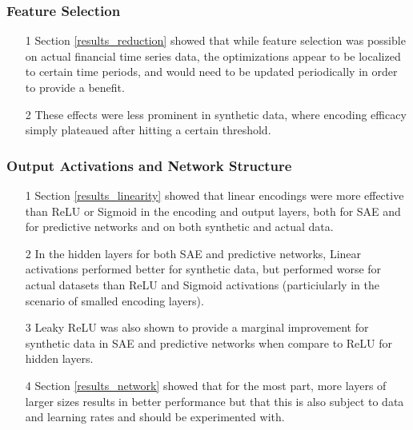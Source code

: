\documentclass[a4paper,11pt,oneside]{article}
\theoremstyle{plain}
\theoremstyle{definition}
\begin{document}
\subsubsection{Feature Selection}
\begin{itemize}
	\item[1] Section \ref{results_reduction} showed that while feature selection was possible on actual financial time series data, the optimizations appear to be localized to certain time periods, and would need to be updated periodically in order to provide a benefit.
	\item[2] These effects were less prominent in synthetic data, where encoding efficacy simply plateaued after hitting a certain threshold.
\end{itemize}

\subsubsection{Output Activations and Network Structure}
\begin{itemize}
	\item[1] Section \ref{results_linearity} showed that linear encodings were more effective than ReLU or Sigmoid in the encoding and output layers, both for SAE and for predictive networks and on both synthetic and actual data.
	\item[2] In the hidden layers for both SAE and predictive networks, Linear activations performed better for synthetic data, but performed worse for actual datasets than ReLU and Sigmoid activations (particiularly in the scenario of smalled encoding layers).
	\item[3] Leaky ReLU was also shown to provide a marginal improvement for synthetic data in SAE and predictive networks when compare to ReLU for hidden layers.
	\item[4] Section \ref{results_network} showed that for the most part, more layers of larger sizes results in better performance but that this is also subject to data and learning rates and should be experimented with.
\end{itemize}
\end{document}
